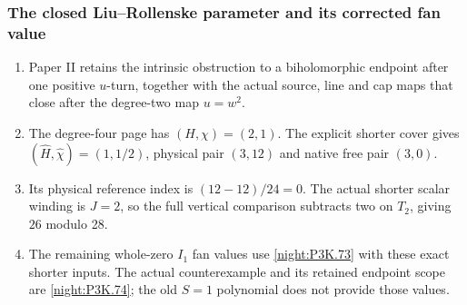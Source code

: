\subsubsection{The closed Liu--Rollenske parameter and its corrected fan value}
\RungOne
\begin{enumerate}[label=\arabic*.]
\item Paper II retains the intrinsic obstruction to a
  biholomorphic endpoint after one positive $u$-turn,
  together with the actual source, line and cap maps
  that close after the degree-two map $u=w^2$.
\item The degree-four page has $(H,\chi)=(2,1)$.
  The explicit shorter cover gives
  $(\widehat H,\widehat\chi)=(1,1/2)$, physical
  pair $(3,12)$ and native free pair $(3,0)$.
\item Its physical reference index is $(12-12)/24=0$.
  The actual shorter scalar winding is $J=2$, so the
  full vertical comparison subtracts two on $T_2$,
  giving $26$ modulo 28.
\item The remaining whole-zero $I_1$ fan values use
  \cref{night:P3K.73} with these exact shorter inputs.
  The actual counterexample and its retained endpoint
  scope are \cref{night:P3K.74}; the old $S=1$
  polynomial does not provide those values.
\end{enumerate}


